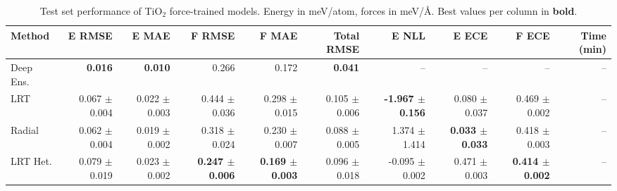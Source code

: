 \begin{table}
\centering
\caption{Test set performance of TiO$_2$ force-trained models. Energy in meV/atom, forces in meV/\AA{}. Best values per column in \textbf{bold}.}
\label{tab:tio2_results}
\begin{tabular}{lrrrrrrrrr}
\toprule
Method & E RMSE & E MAE & F RMSE & F MAE & Total RMSE & E NLL & E ECE & F ECE & Time (min) \\
\midrule
Deep Ens. & \textbf{0.016} & \textbf{0.010} & 0.266 & 0.172 & \textbf{0.041} & -- & -- & -- & -- \\
LRT & 0.067 $\pm$ 0.004 & 0.022 $\pm$ 0.003 & 0.444 $\pm$ 0.036 & 0.298 $\pm$ 0.015 & 0.105 $\pm$ 0.006 & \textbf{-1.967 $\pm$ 0.156} & 0.080 $\pm$ 0.037 & 0.469 $\pm$ 0.002 & -- \\
Radial & 0.062 $\pm$ 0.004 & 0.019 $\pm$ 0.002 & 0.318 $\pm$ 0.024 & 0.230 $\pm$ 0.007 & 0.088 $\pm$ 0.005 & 1.374 $\pm$ 1.414 & \textbf{0.033 $\pm$ 0.033} & 0.418 $\pm$ 0.003 & -- \\
LRT Het. & 0.079 $\pm$ 0.019 & 0.023 $\pm$ 0.002 & \textbf{0.247 $\pm$ 0.006} & \textbf{0.169 $\pm$ 0.003} & 0.096 $\pm$ 0.018 & -0.095 $\pm$ 0.002 & 0.471 $\pm$ 0.003 & \textbf{0.414 $\pm$ 0.002} & -- \\
\bottomrule
\end{tabular}
\end{table}